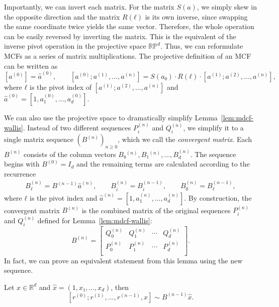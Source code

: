 Importantly, we can invert each matrix.
For the matrix $S(a)$, we simply skew in the opposite direction
and the matrix $R(ℓ)$ is its own inverse, since swapping the same coordinate
twice yields the same vector.
Therefore, the whole operation can be easily reversed by inverting the matrix.
This is the equivalent of the inverse pivot operation in the projective space $\mathbb{RP}^d$.
Thus, we can reformulate MCFs as a series of matrix multiplications.
The projective definition of an MCF can be written as
\[
  [a^{(0)}] = \hat a^{(0)}, \qquad
  [a^{(0)}; a^{(1)}, …, a^{(n)}] = S(a₀) · R(ℓ) · [a^{(1)}; a^{(2)}, …, a^{(n)}],
\]
where $ℓ$ is the pivot index of $[a^{(1)}; a^{(2)}, …, a^{(n)}]$
and $\hat a^{(0)} = [1, a_1^{(0)}, …, a_d^{(0)}]$.

We can also use the projective space to dramatically simplify Lemma~\ref{lem:mdcf-wallis}.
Instead of two different sequences $P_i^{(n)}$ and $Q_i^{(n)}$, we simplify it
to a single matrix sequence $(B^{(n)})_{n ≥ 0}$, which we call the
\emph{convergent matrix}.
Each $B^{(n)}$ consists of the column vectors $B₀^{(n)}, B₁^{(n)}, …, B_d^{(n)}$.
The sequence begins with $B^{(0)} = I_d$
and the remaining terms are calculated according to the recurrence
\begin{align*}
  B_ℓ^{(n)} = B^{(n-1)} \hat a^{(n)},
  \qquad B_i^{(n)} = B_i^{(n-1)},
  \qquad B_0^{(n)} = B_ℓ^{(n-1)},
\end{align*}
where $ℓ$ is the pivot index and $\hat a^{(n)} = [1, a_1^{(n)}, …, a_d^{(n)}]$.
By construction, the convergent matrix $B^{(n)}$ is the combined matrix of the original sequences
$P_i^{(n)}$ and $Q_i^{(n)}$ defined for Lemma~\vref{lem:mdcf-wallis}:
\[
  B^{(n)} = \begin{bmatrix}
    Q_0^{(n)} & Q_1^{(n)} & ⋯ & Q_d^{(n)} \\
    P_0^{(n)} & P_1^{(n)} & ⋯ & P_d^{(n)} \\
  \end{bmatrix}.
\]
In fact, we can prove an equivalent statement from this lemma using the new sequence.

\begin{lemma}
  \label{lem:mdcf-wallis'}
  Let $x ∈ ℝ^d$ and $\hat x = (1, x₁, …, x_d)$, then
  \[
    [r^{(0)}; r^{(1)}, …, r^{(n-1)}, x] \sim B^{(n-1)} \hat x.
  \]
\end{lemma}

